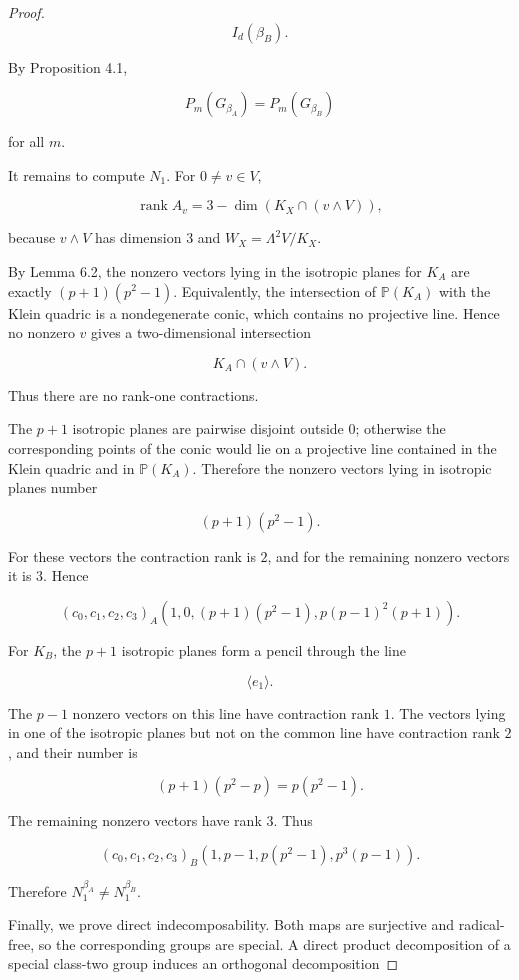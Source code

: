 \documentclass[11pt]{article}
\begin{document}
\begin{proof}
\[
I_d(\beta_B).
\]

By Proposition 4.1,

\[
P_m(G_{\beta_A})=P_m(G_{\beta_B})
\]

for all $m$.

It remains to compute $N_1$. For $0\ne v\in V$,

\[
\operatorname{rank}A_v
=3-\dim(K_X\cap(v\wedge V)),
\]

because $v\wedge V$ has dimension $3$ and $W_X=\Lambda^2V/K_X$.

By Lemma 6.2, the nonzero vectors lying in the isotropic planes for $K_A$ are exactly $(p+1)(p^2-1)$. Equivalently, the intersection of $\mathbb P(K_A)$ with the Klein quadric is a nondegenerate conic, which contains no projective line. Hence no nonzero $v$ gives a two-dimensional intersection

\[
K_A\cap(v\wedge V).
\]

Thus there are no rank-one contractions.

The $p+1$ isotropic planes are pairwise disjoint outside $0$; otherwise the corresponding points of the conic would lie on a projective line contained in the Klein quadric and in $\mathbb P(K_A)$. Therefore the nonzero vectors lying in isotropic planes number

\[
(p+1)(p^2-1).
\]

For these vectors the contraction rank is $2$, and for the remaining nonzero vectors it is $3$. Hence

\[
(c_0,c_1,c_2,c_3)_A
\left(
1,
0,
(p+1)(p^2-1),
p(p-1)^2(p+1)
\right).
\]

For $K_B$, the $p+1$ isotropic planes form a pencil through the line

\[
\langle e_1\rangle.
\]

The $p-1$ nonzero vectors on this line have contraction rank $1$. The vectors lying in one of the isotropic planes but not on the common line have contraction rank $2$, and their number is

\[
(p+1)(p^2-p)=p(p^2-1).
\]

The remaining nonzero vectors have rank $3$. Thus

\[
(c_0,c_1,c_2,c_3)_B
\left(
1,
p-1,
p(p^2-1),
p^3(p-1)
\right).
\]

Therefore $N_1^{\beta_A}\ne N_1^{\beta_B}$.

Finally, we prove direct indecomposability. Both maps are surjective and radical-free, so the corresponding groups are special. A direct product decomposition of a special class-two group induces an orthogonal decomposition


\end{proof}
\end{document}
